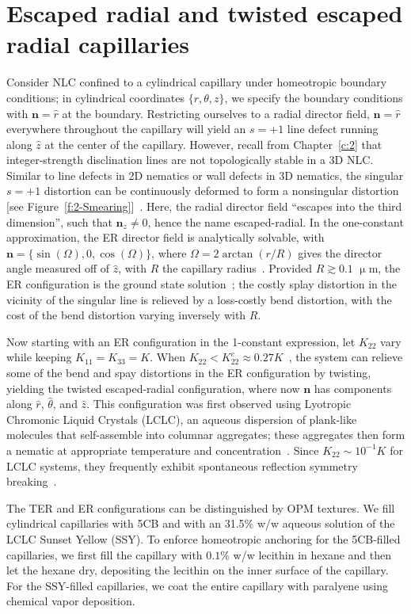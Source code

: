 \section{Escaped radial and twisted escaped radial capillaries}
Consider NLC confined to a cylindrical capillary under homeotropic boundary conditions; in cylindrical coordinates $\{r,\theta,z\}$, we specify the boundary conditions with $\mathbf{n} = \hat{r}$ at the boundary.
Restricting ourselves to a radial director field, $\mathbf{n} = \hat{r}$ everywhere throughout the capillary will yield an $s = +1$ line defect running along $\hat{z}$ at the center of the capillary.
However, recall from Chapter~\ref{c:2} that integer-strength disclination lines are not topologically stable in a 3D NLC.
Similar to line defects in 2D nematics or wall defects in 3D nematics, the singular $s = +1$ distortion can be continuously deformed to form a nonsingular distortion [see Figure~\ref{f:2-Smearing}]~\cite{RN179,RN290,RN289}.
Here, the radial director field ``escapes into the third dimension'', such that  $\mathbf{n}_{z} \neq 0$, hence the name escaped-radial.
In the one-constant approximation, the ER director field is analytically solvable, with $\mathbf{n} = \{\sin(\Omega),0,\cos(\Omega)\}$, where $\Omega = 2 \arctan(r/R)$ gives the director angle measured off of $\hat{z}$, with $R$ the capillary radius~\cite{RN179,RN290}.
Provided $R \gtrsim 0.1$ $\upmu$m, the ER configuration is the ground state solution~\cite{RN194}; the costly splay distortion in the vicinity of the singular line is relieved by a loss-costly bend distortion, with the cost of the bend distortion varying inversely with $R$.

Now starting with an ER configuration in the 1-constant expression, let $K_{22}$ vary while keeping $K_{11} = K_{33} = K$.
When $K_{22} < K^c_{22} \approx 0.27K$~\cite{RN192}, the system can relieve some of the bend and spay distortions in the ER configuration by twisting, yielding the twisted escaped-radial configuration, where now $\mathbf{n}$ has components along $\hat{r}$, $\hat{\theta}$, and $\hat{z}$.
This configuration was first observed using Lyotropic Chromonic Liquid Crystals (LCLC), an aqueous dispersion of plank-like molecules that self-assemble into columnar aggregates; these aggregates then form a nematic at appropriate temperature and concentration~\cite{RN303}.
Since $K_{22} \sim 10^{-1}K$ for LCLC systems, they frequently exhibit spontaneous reflection symmetry breaking~\cite{RN192,RN191,RN293,RN193,RN302}.

The TER and ER configurations can be distinguished by OPM textures.
We fill cylindrical capillaries with 5CB and with an 31.5\% w/w aqueous solution of the LCLC Sunset Yellow (SSY).
To enforce homeotropic anchoring for the 5CB-filled capillaries, we first fill the capillary with $0.1\%$ w/w lecithin in hexane and then let the hexane dry, depositing the lecithin on the inner surface of the capillary.
For the SSY-filled capillaries, we coat the entire capillary with paralyene using chemical vapor deposition.


